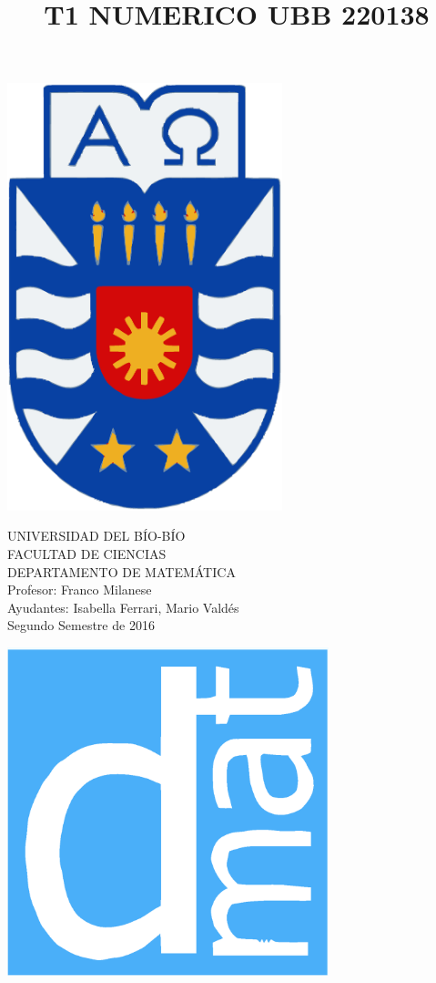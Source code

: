\documentclass[11pt]{article}
\begin{document}
\title{T1 NUMERICO UBB 220138}

{\begin{minipage}{2cm}
\hspace*{1cm}\includegraphics[width=0.6\textwidth]{escubo-ubb.eps}
\end{minipage}
\begin{minipage}{12cm}
\small
{\bf \rm 
{
\begin{center}
{\footnotesize UNIVERSIDAD DEL B\'IO-B\'IO} \\
{\scriptsize FACULTAD DE CIENCIAS}  \\
{\scriptsize DEPARTAMENTO DE MATEM\'ATICA}  \\
{\scriptsize Profesor:  Franco Milanese}\\
{\scriptsize Ayudantes: Isabella Ferrari, Mario Valdés}\\
{\scriptsize Segundo Semestre de 2016}
\end{center}
}}
\end{minipage}}
{\begin{minipage}{2cm}
\hspace*{-0.5cm}\vspace*{-0.05cm}\includegraphics[width=0.7\textwidth]{escudo-dmat.eps}
\end{minipage}}
\end{document}

